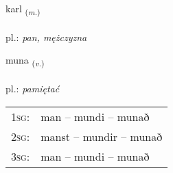 \documentclass[frontgrid, backgrid]{flacards}\usepackage[]{graphicx}\usepackage[]{xcolor}
\begin{document}
\renewcommand{\flhead}{\vskip5pt \fboxsep=0pt {\small\bfseries\footnotesize Nafnorð | rzeczownik}}
\renewcommand{\fcfoot}{\vskip5pt \fboxsep=0pt \hspace{2pt}{\small\bfseries\footnotesize 1K}}

\renewcommand{\blhead}{\vskip5pt {\small\bfseries\footnotesize Nafnorð | rzeczownik }}
\renewcommand{\bcfoot}{\vskip5pt \hspace{2pt}{\small\bfseries\footnotesize 1K}}


{karl \small{\textsubscript{(\textit{m.})}} \\[1ex] %
\textphonetic{[kʰartl̥]} \\
pl.: \emph{pan, mężczyzna} \\  [2ex]
\renewcommand*{\arraystretch}{0.8}
}

\renewcommand{\flhead}{\vskip5pt \fboxsep=0pt {\small\bfseries\footnotesize Sagnorð | czasownik}}
\renewcommand{\fcfoot}{\vskip5pt \fboxsep=0pt \hspace{2pt}{\small\bfseries\footnotesize 1K}}

\renewcommand{\blhead}{\vskip5pt {\small\bfseries\footnotesize Sagnorð | czasownik }}
\renewcommand{\bcfoot}{\vskip5pt \hspace{2pt}{\small\bfseries\footnotesize 1K}}


{muna \small{\textsubscript{(\textit{v.})}} \\[1ex] %
\textphonetic{[mʏːna]} \\
pl.: \emph{pamiętać} \\  [2ex]
\renewcommand*{\arraystretch}{0.8}
\begin{tabular}{p{1cm}l}
\textsc{1sg}: & man -- mundi -- munað \\ 
\textsc{2sg}: & manst -- mundir -- munað \\ 
\textsc{3sg}: & man -- mundi -- munað \\ 
\end{tabular}
}
\end{document}

